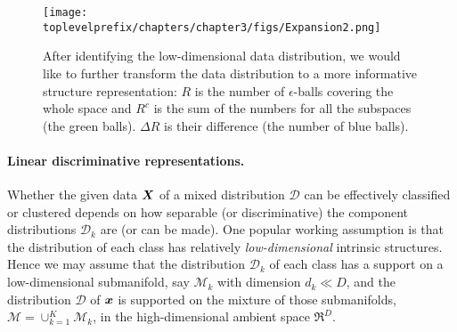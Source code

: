 \documentclass[../../book-main.tex]{subfiles}
\begin{document}


\begin{figure}[ht]
	\centering
	\texttt{[image: \\toplevelprefix/chapters/chapter3/figs/Expansion2.png]}
	\caption{After identifying the low-dimensional data distribution, we would like to further transform the data distribution to a more informative structure representation: $R$ is the number of $\epsilon$-balls covering the whole space and $R^c$ is the sum of the numbers for all the subspaces (the green balls). $\Delta R$ is their difference (the number of blue balls). }\label{fig:sphere-packing}
	\label{fig:informative-representation}
\end{figure}


\paragraph{Linear discriminative representations.}
Whether the given data $\bm{X}$ of a mixed distribution $\mathcal{D}$ can be effectively classified or clustered depends on how separable (or discriminative) the component distributions $\mathcal{D}_k$ are (or can be made). One popular working assumption is that the distribution of each class has relatively {\em low-dimensional} intrinsic structures. Hence we may assume that the distribution $\mathcal{D}_k$ of each class has a support on a low-dimensional submanifold, say $\mathcal{M}_k$ with dimension $d_k \ll D$, and the distribution $\mathcal D$ of $\bm{x}$ is supported on the mixture of those submanifolds, $\mathcal M = \cup_{k=1}^K \mathcal{M}_k$,  in the high-dimensional ambient space $\Re^D$.
\end{document}
